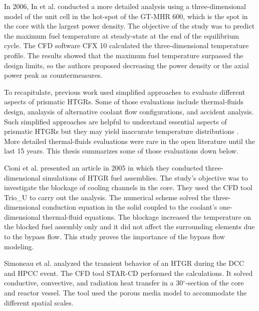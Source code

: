 In 2006, In et al. \cite{in_three-dimensional_2006} conducted a more detailed analysis using a three-dimensional model of the unit cell in the hot-spot of the GT-MHR 600, which is the spot in the core with the largest power density.
The objective of the study was to predict the maximum fuel temperature at steady-state at the end of the equilibrium cycle.
The \gls{CFD} software CFX 10 \cite{ansys_inc_cfx_2006} calculated the three-dimensional temperature profile.
The results showed that the maximum fuel temperature surpassed the design limits, so the authors proposed decreasing the power density or the axial power peak as countermeasures.

To recapitulate, previous work used simplified approaches to evaluate different aspects of prismatic HTGRs.
Some of those evaluations include thermal-fluids design, analaysis of alternative coolant flow configurations, and accident analysis.
Such simplified approaches are helpful to understand essential aspects of prismatic HTGRs but they may yield inaccurate temperature distributions \cite{tak_numerical_2008}.
More detailed thermal-fluids evaluations were rare in the open literature until the last 15 years.
This thesis summarizes some of those evaluations down below.

Cioni et al. \cite{cioni_3d_2005} presented an article in 2005 in which they conducted three-dimensional simulations of HTGR fuel assemblies.
The study's objective was to investigate the blockage of cooling channels in the core.
They used the \gls{CFD} tool Trio\_U \cite{bieder_priceles_2000} to carry out the analysis.
The numerical scheme solved the three-dimensional conduction equation in the solid coupled to the coolant's one-dimensional thermal-fluid equations.
The blockage increased the temperature on the blocked fuel assembly only and it did not affect the surrounding elements due to the bypass flow.
This study proves the importance of the bypass flow modeling.

Simoneau et al. \cite{simoneau_three-dimensional_2007} analyzed the transient behavior of an \gls{HTGR} during the \gls{DCC} and \gls{HPCC} event.
The CFD tool STAR-CD \cite{computational_dynamics_limited_star-cd_2004} performed the calculations.
It solved conductive, convective, and radiation heat transfer in a 30$^{\circ}$-section of the core and reactor vessel.
The tool used the porous media model to accommodate the different spatial scales.


